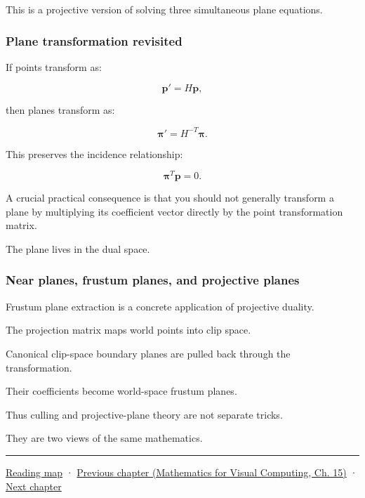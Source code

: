 This is a projective version of solving three simultaneous plane equations.

\subsubsection{Plane transformation revisited}\label{02-foundations-ii-ch032-plane-transformation-revisited}

If points transform as:

\[
 \mathbf p'=H\mathbf p,
\]

then planes transform as:

\[
 \boxed{ \boldsymbol\pi'=H^{-T}\boldsymbol\pi }.
\]

This preserves the incidence relationship:

\[
 \boldsymbol\pi^T\mathbf p=0.
\]

A crucial practical consequence is that you should not generally transform a plane by multiplying its coefficient vector directly by the point transformation matrix.

The plane lives in the dual space.

\subsubsection{Near planes, frustum planes, and projective planes}\label{02-foundations-ii-ch032-near-planes-frustum-planes-and-projective-planes}

Frustum plane extraction is a concrete application of projective duality.

The projection matrix maps world points into clip space.

Canonical clip-space boundary planes are pulled back through the transformation.

Their coefficients become world-space frustum planes.

Thus culling and projective-plane theory are not separate tricks.

They are two views of the same mathematics.

\begin{center}\rule{0.5\linewidth}{0.5pt}\end{center}

\hyperref[volume-reading-map]{Reading map} · \href{../02-Mathematics-for-Visual-Computing/main.pdf\#nameddest=02-foundations-ii-ch031-implement-probability-with-numerical-contracts}{Previous chapter (Mathematics for Visual Computing, Ch. 15)} · \hyperref[02-foundations-ii-ch033-projection-clipping-and-raster-sampling]{Next chapter}
